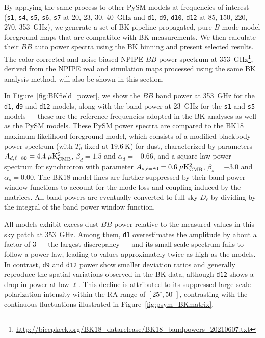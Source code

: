 \documentclass[twocolumn]{aastex631}
\begin{document}
By applying the same process to other PySM models at frequencies of interest (\texttt{s1}, \texttt{s4}, \texttt{s5}, \texttt{s6}, \texttt{s7} at 20, 23, 30, 40~GHz and \texttt{d1}, \texttt{d9}, \texttt{d10}, \texttt{d12} at 85, 150, 220, 270, 353~GHz), we generate a set of BK pipeline propagated, pure $B$-mode model foreground maps that are compatible with BK measurements. We then calculate their $BB$ auto power spectra using the BK binning and present selected results. The color-corrected and noise-biased NPIPE $BB$ power spectrum at 353~GHz\footnote{\url{http://bicepkeck.org/BK18_datarelease/BK18_bandpowers_20210607.txt}}, derived from the NPIPE real and simulation maps processed using the same BK analysis method, will also be shown in this section. 

In Figure~\ref{fig:BKfield_power}, we show the $BB$ band power at 353~GHz for the \texttt{d1}, \texttt{d9} and \texttt{d12} models, along with the band power at 23~GHz for the \texttt{s1} and \texttt{s5} models --- these are the reference frequencies adopted in the BK analyses as well as the PySM models. These PySM power spectra are compared to the BK18 maximum likelihood foreground model, which consists of a modified blackbody power spectrum (with $T_d$ fixed at $19.6~\text{K}$) for dust, characterized by parameters $A_{d,\ell=80} = 4.4 \; \mu\rm{K^2_{CMB}}$, $\beta_d = 1.5$ and $\alpha_d = -0.66$, and a square-law power spectrum for synchrotron with parameter $A_{s,\ell=80} = 0.6 \; \mu\rm{K^2_{CMB}}$, $\beta_s = -3.0$ and $\alpha_s = 0.00$. The BK18 model lines are further suppressed by their band power window functions to account for the mode loss and coupling induced by the matrices. All band powers are eventually converted to full-sky $D_\ell$ by dividing by the integral of the band power window function.

All models exhibit excess dust $BB$ power relative to the measured values in this sky patch at 353~GHz. Among them, \texttt{d1} overestimates the amplitude by about a factor of 3 --- the largest discrepancy --- and its small-scale spectrum fails to follow a power law, leading to values approximately twice as high as the models. In contrast, \texttt{d9} and \texttt{d12} power show smaller deviation ratios and generally reproduce the spatial variations observed in the BK data, although \texttt{d12} shows a drop in power at low-$\ell$. This decline is attributed to its suppressed large-scale polarization intensity within the RA range of $[25^{\circ}, 50^{\circ}]$, contrasting with the continuous fluctuations illustrated in Figure~\ref{fig:psym_BKmatrix}. 
\end{document}
